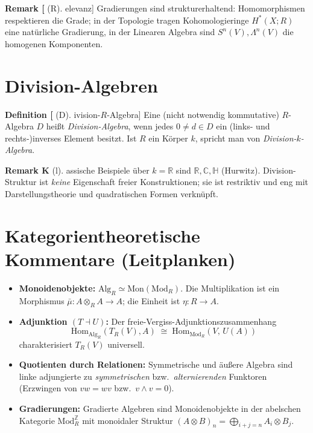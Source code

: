\documentclass[10pt, letterpaper]{article}
\newcommand{\Z}{\mathbb{Z}}
\newcommand{\Mod}{\mathrm{Mod}}
\newcommand{\Alg}{\mathrm{Alg}}
\newcommand{\Hom}{\mathrm{Hom}}
\newcommand{\CustomHeading}[3]{%
  \par\medskip\noindent%
  \textbf{#1 #2} \textnormal{(#3)}.\enskip%
}
\newenvironment{DEF}[2]{\begin{unitbox}\CustomHeading{Definition}{#1}{#2}}{\end{unitbox}}
\newenvironment{REM}[2]{\begin{unitbox}\CustomHeading{Remark}{#1}{#2}}{\end{unitbox}}
\begin{document}
\begin{REM}[Relevanz]
Gradierungen sind strukturerhaltend: Homomorphismen respektieren die Grade;
in der Topologie tragen Kohomologieringe \(H^\ast(X;R)\) eine natürliche Gradierung,
in der Linearen Algebra sind \(S^n(V),\Lambda^n(V)\) die homogenen Komponenten.
\end{REM}

\section{Division-Algebren}
\begin{DEF}[Division-\(R\)-Algebra]
Eine (nicht notwendig kommutative) \(R\)-Algebra \(D\) heißt \emph{Division-Algebra},
wenn jedes \(0\neq d\in D\) ein (links- und rechts-)inverses Element besitzt.
Ist \(R\) ein Körper \(k\), spricht man von \emph{Division-\(k\)-Algebra}.
\end{DEF}

\begin{REM}
Klassische Beispiele über \(k=\mathbb{R}\) sind \(\mathbb{R},\mathbb{C},\mathbb{H}\) (Hurwitz).
Division-Struktur ist \emph{keine} Eigenschaft freier Konstruktionen; sie ist restriktiv
und eng mit Darstellungstheorie und quadratischen Formen verknüpft.
\end{REM}

\section{Kategorientheoretische Kommentare (Leitplanken)}
\begin{itemize}[leftmargin=*]
\item \textbf{Monoidenobjekte:} \(\Alg_R\simeq \mathrm{Mon}(\Mod_R)\). Die Multiplikation ist ein Morphismus
\(\bar\mu:A\otimes_R A\to A\); die Einheit ist \(\eta:R\to A\).
\item \textbf{Adjunktion \((T\dashv U)\):} Der freie-Vergiss-Adjunktionszusammenhang
\[
\Hom_{\Alg_R}(T_R(V),A)\;\cong\;\Hom_{\Mod_R}(V,\,U(A))
\]
charakterisiert \(T_R(V)\) universell.
\item \textbf{Quotienten durch Relationen:} Symmetrische und äußere Algebra sind
linke adjungierte zu \emph{symmetrischen} bzw.\ \emph{alternierenden} Funktoren
(Erzwingen von \(vw=wv\) bzw.\ \(v\wedge v=0\)).
\item \textbf{Gradierungen:} Gradierte Algebren sind Monoidenobjekte in der abelschen Kategorie
\(\Mod_R^{\Z}\) mit monoidaler Struktur \((A\otimes B)_n=\bigoplus_{i+j=n}A_i\otimes B_j\).
\end{itemize}
\end{document}
